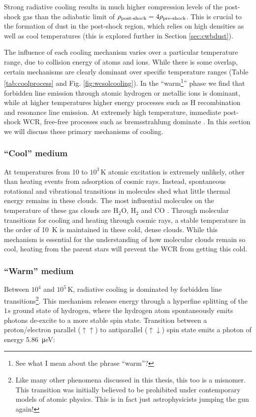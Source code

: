 Strong radiative cooling results in much higher compression levels of the post-shock gas than the adiabatic limit of $\rho_\text{post-shock} = 4\rho_\text{pre-shock}$.
This is crucial to the formation of dust in the post-shock region, which relies on high densities as well as cool temperatures (this is explored further in Section \ref{sec:cwbdust}).

The influence of each cooling mechanism varies over a particular temperature range, due to collision energy of atoms and ions.
While there is some overlap, certain mechanisms are clearly dominant over specific temperature ranges (Table \ref{tab:coolprocess} and Fig. \ref{fig:wcsolcooling}).
In the ``warm\footnote{See what I mean about the phrase ``warm''?}'' phase we find that forbidden line emission through atomic hydrogen or metallic ions is dominant, while at higher temperatures higher energy processes such as H recombination and resonance line emission.
At extremely high temperature, immediate post-shock WCR, free-free processes such as bremsstrahlung dominate
\parencite[Ch.~6]{dysonPhysicsInterstellarMedium2021}.
In this section we will discuss these primary mechanisms of cooling.

\subsubsection{``Cool'' medium}

At temperatures from 10 to $10^3 \, \si{\kelvin}$ atomic excitation is extremely unlikely, other than heating events from adsorption of cosmic rays.
Instead, spontaneous rotational and vibrational transitions in molecules shed what little thermal energy remains in these clouds.
The most influential molecules on the temperature of these gas clouds are $\text{H}_2 \text{O}$, $\text{H}_2$ and $\text{CO}$
\parencite{neufeldRadiativeCoolingWarm1993,neufeldThermalBalanceDense1995}.
Through molecular transitions for cooling and heating through cosmic rays, a stable temperature in the order of \SI{10}{\kelvin} is maintained in these cold, dense clouds.
While this mechanism is essential for the understanding of how molecular clouds remain so cool, heating from the parent stars will prevent the WCR from getting this cold.

\subsubsection{``Warm'' medium}

Between $10^4$ and $10^5 \, \si{\kelvin}$, radiative cooling is dominated by forbidden line transitions\footnote{Like many other phenomena discussed in this thesis, this too is a misnomer. This transition was initially believed to be prohibited under contemporary models of atomic physics. This is in fact just astrophysicists jumping the gun again!}.
This mechanism releases energy through a hyperfine splitting of the $1s$ ground state of hydrogen, where the hydrogen atom spontaneously emits photons de-excite to a more stable spin state.
Transition between a proton/electron parallel ($\uparrow\uparrow$) to antiparallel ($\uparrow\downarrow$) spin state emits a photon of energy \SI{5.86}{\micro\electronvolt}:

